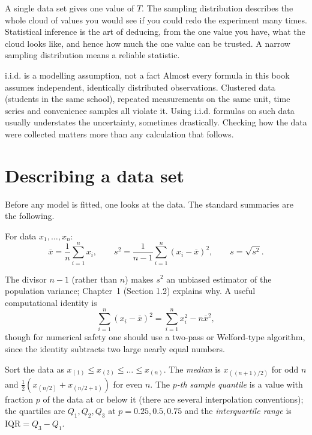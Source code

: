 \begin{intuition}
A single data set gives one value of $T$. The sampling distribution describes the whole cloud of values you would see if you could redo the experiment many times. Statistical inference is the art of deducing, from the one value you have, what the cloud looks like, and hence how much the one value can be trusted. A narrow sampling distribution means a reliable statistic.
\end{intuition}

\begin{pitfall}{i.i.d. is a modelling assumption, not a fact}
Almost every formula in this book assumes independent, identically distributed observations. Clustered data (students in the same school), repeated measurements on the same unit, time series and convenience samples all violate it. Using i.i.d. formulas on such data usually understates the uncertainty, sometimes drastically. Checking how the data were collected matters more than any calculation that follows.
\end{pitfall}

\section{Describing a data set}

Before any model is fitted, one looks at the data. The standard summaries are the following.

\begin{definition}
For data $x_1,\dots,x_n$:
\[ \bar{x}=\frac1n\sum_{i=1}^nx_i,\qquad s^2=\frac1{n-1}\sum_{i=1}^n(x_i-\bar{x})^2,\qquad s=\sqrt{s^2}. \]
\end{definition}

The divisor $n-1$ (rather than $n$) makes $s^2$ an unbiased estimator of the population variance; Chapter~1 (Section 1.2) explains why. A useful computational identity is
\[ \sum_{i=1}^n(x_i-\bar{x})^2=\sum_{i=1}^nx_i^2-n\bar{x}^2, \]
though for numerical safety one should use a two-pass or Welford-type algorithm, since the identity subtracts two large nearly equal numbers.

\begin{definition}
Sort the data as $x_{(1)}\le x_{(2)}\le\dots\le x_{(n)}$. The \emph{median} is $x_{((n+1)/2)}$ for odd $n$ and $\tfrac12(x_{(n/2)}+x_{(n/2+1)})$ for even $n$. The \emph{$p$-th sample quantile} is a value with fraction $p$ of the data at or below it (there are several interpolation conventions); the quartiles are $Q_1,Q_2,Q_3$ at $p=0.25,0.5,0.75$ and the \emph{interquartile range} is $\mathrm{IQR}=Q_3-Q_1$.
\end{definition}

